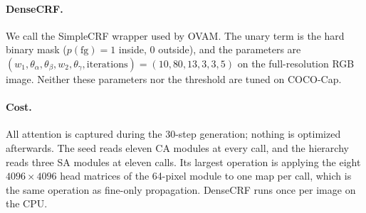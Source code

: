 \paragraph{DenseCRF.}
We call the SimpleCRF wrapper used by OVAM. The unary term is the hard binary mask ($p(\text{fg}){=}1$ inside, $0$ outside), and the parameters are $(w_1,\theta_\alpha,\theta_\beta,w_2,\theta_\gamma,\text{iterations})=(10,80,13,3,3,5)$ on the full-resolution RGB image. Neither these parameters nor the threshold are tuned on COCO-Cap.

\paragraph{Cost.}
All attention is captured during the 30-step generation; nothing is optimized afterwards. The seed reads eleven CA modules at every call, and the hierarchy reads three SA modules at eleven calls. Its largest operation is applying the eight $4096\times4096$ head matrices of the 64-pixel module to one map per call, which is the same operation as fine-only propagation. DenseCRF runs once per image on the CPU.
\clearpage
